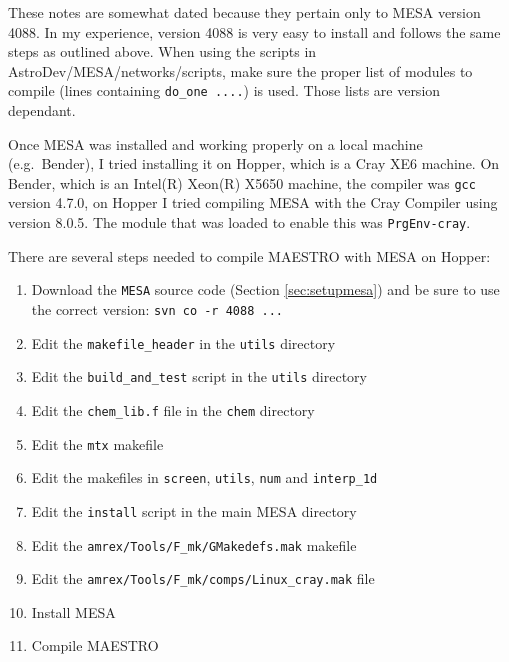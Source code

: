 These notes are somewhat dated because they pertain only to {\sf MESA} version 
4088. In my experience, version 4088 is 
very easy to install and follows the same steps as outlined above. When using 
the scripts in 
{\sf AstroDev/MESA/networks/scripts}, make sure the proper list of modules to 
compile (lines containing {\tt do\_one ....}) is used. Those lists are 
version dependant.

Once {\sf MESA} was installed and working properly on a local machine (e.g.\ 
Bender), I tried installing it on Hopper, which is a Cray XE6 machine. On 
Bender, which is an Intel(R) Xeon(R) X5650 machine, the compiler was 
{\tt gcc} version 4.7.0, on Hopper I tried compiling {\sf MESA} with the 
Cray Compiler using version 8.0.5. The module that was loaded to enable this 
was {\tt PrgEnv-cray}.

There are several steps needed to compile {\sf MAESTRO} with {\sf MESA} on 
Hopper:
\begin{enumerate}
\item Download the {\tt MESA} source code (Section \ref{sec:setupmesa}) and 
be sure to use the correct version: {\tt svn co -r 4088 ...}
\item Edit the {\tt makefile\_header} in the {\tt utils} directory
\item Edit the {\tt build\_and\_test} script in the {\tt utils} directory
\item Edit the {\tt chem\_lib.f} file in the {\tt chem} directory
\item Edit the {\tt mtx} makefile
\item Edit the makefiles in {\tt screen}, {\tt utils}, {\tt num} and 
{\tt interp\_1d}
\item Edit the {\tt install} script in the main {\sf MESA} directory
\item Edit the {\tt amrex/Tools/F\_mk/GMakedefs.mak} makefile
\item Edit the {\tt amrex/Tools/F\_mk/comps/Linux\_cray.mak} file
\item Install {\sf MESA}
\item Compile {\sf MAESTRO}
\end{enumerate}

